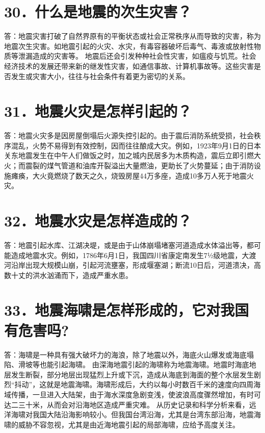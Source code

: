 \documentclass[a4paper,10pt,english]{sphinxmanual}
\begin{document}
\section{30．什么是地震的次生灾害？}
\label{\detokenize{index:id32}}
答：地震灾害打破了自然界原有的平衡状态或社会正常秩序从而导致的灾害，称为地震次生灾害。如地震引起的火灾、水灾，有毒容器破坏后毒气、毒液或放射性物质等泄漏造成的灾害等。
地震后还会引发种种社会性灾害，如瘟疫与饥荒。社会经济技术的发展还带来新的继发性灾害，如通信事故、计算机事故等。这些灾害是否发生或灾害大小，往往与社会条件有着更为密切的关系。


\section{31．地震火灾是怎样引起的？}
\label{\detokenize{index:id33}}
答：地震火灾多是因房屋倒塌后火源失控引起的。由于震后消防系统受损，社会秩序混乱，火势不易得到有效控制，因而往往酿成大灾。例如，1923年9月1日的日本关东地震发生在中午人们做饭之时，加之城内民居多为木质构造，震后立即引燃大火；而震裂的煤气管道和油库开裂溢出大量燃油，更助长了火势蔓延；由于消防设施瘫痪，大火竟燃烧了数天之久，烧毁房屋44万多座，造成10多万人死于地震火灾。


\section{32．地震水灾是怎样造成的？}
\label{\detokenize{index:id34}}
答：地震引起水库、江湖决堤，或是由于山体崩塌堵塞河道造成水体溢出等，都可能造成地震水灾。例如，1786年6月1日，我国四川省康定南发生7½级地震，大渡河沿岸出现大规模山崩，引起河流壅塞，形成堰塞湖；断流10日后，河道溃决，高数十丈的洪水汹涌而下，造成严重水患。


\section{33．地震海啸是怎样形成的，它对我国有危害吗?}
\label{\detokenize{index:id35}}
答：海啸是一种具有强大破坏力的海浪，除了地震以外，海底火山爆发或海底塌陷、滑坡等也能引起海啸。
由深海地震引起的海啸称为地震海啸。地震时海底地层发生断裂，部分地层出现猛烈上升或下沉，造成从海底到海面的整个水层发生剧烈“抖动”，这就是地震海啸。海啸形成后，大约以每小时数百千米的速度向四周海域传播，一旦进入大陆架，由于海水深度急剧变浅，使波浪高度骤然增加，有时可达二三十米，从而会对沿海地区造成严重灾难。
从历史记录和科学分析来看，远洋海啸对我国大陆沿海影响较小。但我国台湾沿海，尤其是台湾东部沿海，地震海啸的威胁不容忽视，尤其是由近海地震引起的局部海啸，应给予高度关注。
\end{document}
